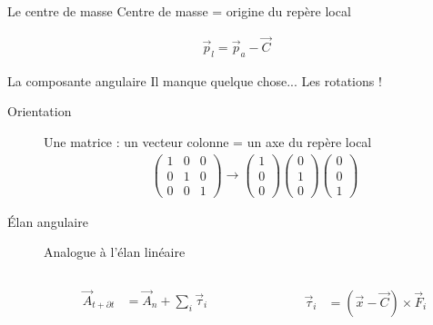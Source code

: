 \documentclass{beamer}
\newcommand{\deriv}{\partial \!}
\begin{document}
\begin{frame}{Le centre de masse}
  Centre de masse = origine du repère local

  \vfill

  \begin{figure}
    
  \end{figure}

  \vfill

  \begin{align*}
    \vec{p}_l = \vec{p}_a - \vec{C}
  \end{align*}
\end{frame}

\begin{frame}{La composante angulaire}
  Il manque quelque chose... Les rotations !

  \begin{description}
  \item[Orientation]
    Une matrice : un vecteur colonne = un axe du repère local
    \begin{align*}
      \begin{pmatrix}
        1 & 0 & 0 \\ 0 & 1 & 0 \\ 0 & 0 & 1
      \end{pmatrix}
      \rightarrow
      \begin{pmatrix}
        1 \\ 0 \\ 0
      \end{pmatrix}
      \begin{pmatrix}
        0 \\ 1 \\ 0
      \end{pmatrix}
      \begin{pmatrix}
        0 \\ 0 \\ 1
      \end{pmatrix}
    \end{align*}
    
    \vfill

  \item[\'Elan angulaire]
    Analogue à l'élan linéaire
    \begin{columns}
      \begin{column}{3cm}
        \begin{align*}
          \vec{A}_{t + \deriv t} &= \vec{A}_n + {\sum_i \vec{\tau}_i}
        \end{align*}
      \end{column}
      \begin{column}{3cm}
        \begin{align*}
          \vec{\tau}_i &= (\vec{x} - \vec{C}) \times \vec{F}_i
        \end{align*}
      \end{column}
    \end{columns}
  \end{description}
\end{frame}
\end{document}
